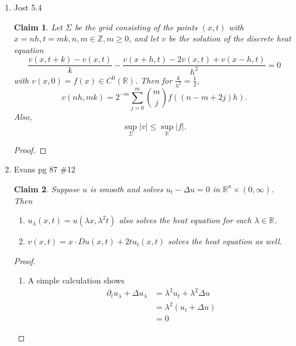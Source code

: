 \documentclass[a4paper]{article}
\newtheorem*{claim}{Claim}
\newcommand{\R}{\mathbb{R}}
\newcommand{\Z}{\mathbb{Z}}
\begin{document}
\begin{enumerate}
\begin{proof}
    \end{proof}

  \item Jost 5.4
    \begin{claim}
      Let $\Sigma$ be the grid consisting of the points $(x,t)$ with $x = nh, t = mk, n,m \in \Z, m \geq 0$, and let $v$ be the solution of the
      discrete heat equation
      \[ \frac{v(x,t+k) - v(x,t)}{k} - \frac{v(x+h,t) - 2v(x,t) + v(x-h,t)}{h^2} = 0 \]
      with $v(x,0) = f(x) \in C^0(\R)$.
      Then for $\frac{k}{h^2} = \frac{1}{2}$,
      \[ v(nh, mk) = 2^{-m} \sum_{j=0}^m \binom{m}{j} f \left( (n - m + 2j)h \right) .\]
      Also,
      \[ \sup_{\Sigma} |v| \leq \sup_\R |f|. \]
    \end{claim}

    \begin{proof}
    \end{proof}

  \item Evans pg 87 \#12
    \begin{claim}
      Suppose $u$ is smooth and solves $u_t - \Delta u = 0$ in $\R^n \times (0,\infty)$. Then
      \begin{enumerate}
        \item $u_\lambda(x,t) = u(\lambda x, \lambda^2 t)$ also solves the heat equation for each $\lambda \in \R$.

        \item $v(x,t) = x \cdot Du(x,t) + 2t u_t(x,t)$ solves the heat equation as well.
      \end{enumerate}

    \end{claim}

    \begin{proof}
      \begin{enumerate}
        \item
          A simple calculation shows
          \begin{align*}
            \partial_t u_\lambda + \Delta u_\lambda &= \lambda^2 u_t + \lambda^2 \Delta u \\
            &= \lambda^2 (u_t + \Delta u) \\
            &= 0
          \end{align*}


\end{enumerate}
\end{proof}
\end{enumerate}
\end{document}
